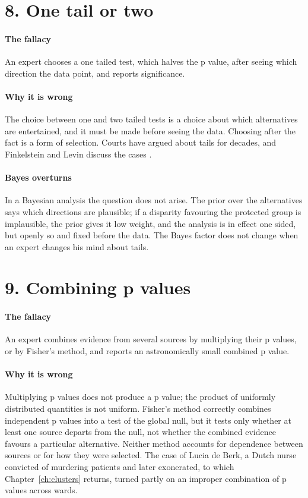 \section{8. One tail or two}

\paragraph{The fallacy} An expert chooses a one tailed test, which halves the p value, after seeing which direction the data point, and reports significance.

\paragraph{Why it is wrong} The choice between one and two tailed tests is a choice about which alternatives are entertained, and it must be made before seeing the data. Choosing after the fact is a form of selection. Courts have argued about tails for decades, and Finkelstein and Levin discuss the cases \citep{finkelstein2015}.

\paragraph{Bayes overturns} In a Bayesian analysis the question does not arise. The prior over the alternatives says which directions are plausible; if a disparity favouring the protected group is implausible, the prior gives it low weight, and the analysis is in effect one sided, but openly so and fixed before the data. The Bayes factor does not change when an expert changes his mind about tails.

\section{9. Combining p values}

\paragraph{The fallacy} An expert combines evidence from several sources by multiplying their p values, or by Fisher's method, and reports an astronomically small combined p value.

\paragraph{Why it is wrong} Multiplying p values does not produce a p value; the product of uniformly distributed quantities is not uniform. Fisher's method correctly combines independent p values into a test of the global null, but it tests only whether at least one source departs from the null, not whether the combined evidence favours a particular alternative. Neither method accounts for dependence between sources or for how they were selected. The case of Lucia de Berk, a Dutch nurse convicted of murdering patients and later exonerated, to which Chapter~\ref{ch:clusters} returns, turned partly on an improper combination of p values across wards.

